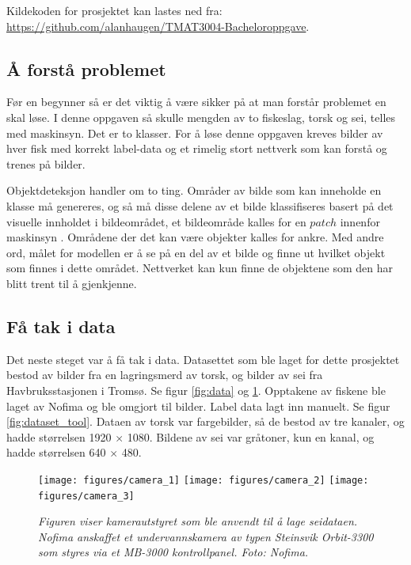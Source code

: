 Kildekoden for prosjektet kan lastes ned fra: \\ \url{https://github.com/alanhaugen/TMAT3004-Bacheloroppgave}.

\subsection{Å forstå problemet}

Før en begynner så er det viktig å være sikker på at man forstår problemet en skal løse. I denne oppgaven så skulle mengden av to fiskeslag, torsk og sei, telles med maskinsyn. Det er to klasser. For å løse denne oppgaven kreves bilder av hver fisk med korrekt label-data og et rimelig stort nettverk som kan forstå og trenes på bilder.

Objektdeteksjon handler om to ting. Områder av bilde som kan inneholde en klasse må genereres, og så må disse delene av et bilde klassifiseres basert på det visuelle innholdet i bildeområdet, et bildeområde kalles for en $patch$ innenfor maskinsyn \cite{LeCun m.fl. 1998 s. 23}. Områdene der det kan være objekter kalles for ankre. Med andre ord, målet for modellen er å se på en del av et bilde og finne ut hvilket objekt som finnes i dette området. Nettverket kan kun finne de objektene som den har blitt trent til å gjenkjenne.

\subsection{Få tak i data}

Det neste steget var å få tak i data. Datasettet som ble laget for dette prosjektet bestod av bilder fra en lagringsmerd av torsk, og bilder av sei fra Havbruksstasjonen i Tromsø. Se figur \ref{fig:data} og \ref{fig:nofima}. Opptakene av fiskene ble laget av Nofima og ble omgjort til bilder. Label data lagt inn manuelt. Se figur \ref{fig:dataset_tool}. Dataen av torsk var fargebilder, så de bestod av tre kanaler, og hadde størrelsen 1920 $\times$ 1080. Bildene av sei var gråtoner, kun en kanal, og hadde størrelsen 640 $\times$ 480. %

\begin{figure}[h!]
\begin{center} 
\texttt{[image: figures/camera\_1]}
\texttt{[image: figures/camera\_2]}
\texttt{[image: figures/camera\_3]}
\caption{\small \sl Figuren viser kamerautstyret som ble anvendt til å lage seidataen. Nofima anskaffet et undervannskamera av typen Steinsvik Orbit-3300 som styres via et MB-3000 kontrollpanel. Foto: Nofima. \label{fig:nofima}} 
\end{center} 
\end{figure} 

